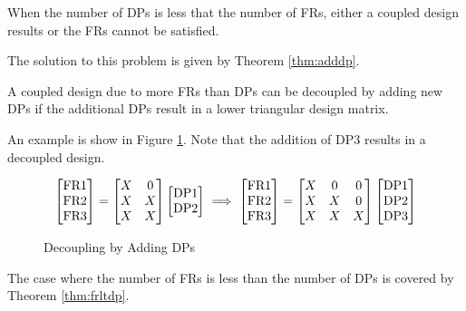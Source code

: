 \begin{theorem}
  \label{thm:frgtdp}
  When the number of DPs is less that the number of FRs, either a coupled design results or the FRs cannot be
  satisfied.
\end{theorem}

The solution to this problem is given by Theorem \ref{thm:adddp}.
\begin{theorem}
  \label{thm:adddp}
  A coupled design due to more FRs than DPs can be decoupled by adding new DPs if the additional DPs result in a
  lower triangular design matrix.
\end{theorem}

An example is show in Figure \ref{fig:dcexample}.  Note that the addition of DP3 results in a decoupled design.

\begin{figure}[h]
  \label{fig:dcexample}
  \[\begin{bmatrix}
  \text{FR}1 \\ \text{FR}2 \\ \text{FR}3
  \end{bmatrix}=\begin{bmatrix}
  X & 0 \\
  X & X \\
  X & X \\
  \end{bmatrix}\begin{bmatrix}
    \text{DP}1 \\ \text{DP}2 \\
  \end{bmatrix}\implies\begin{bmatrix}
  \text{FR}1 \\ \text{FR}2 \\ \text{FR}3
  \end{bmatrix}=\begin{bmatrix}
  X & 0 & 0 \\
  X & X & 0 \\
  X & X & X \\
  \end{bmatrix}\begin{bmatrix}
    \text{DP}1 \\ \text{DP}2 \\ \text{DP}3
  \end{bmatrix}\]
  \caption{Decoupling by Adding DPs}
\end{figure}

The case where the number of FRs is less than the number of DPs is covered by Theorem \ref{thm:frltdp}.


